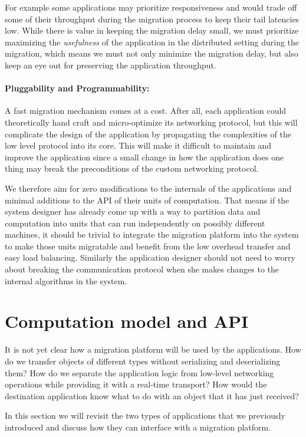 For example some applications may prioritize responsiveness and
    would trade off
    some of their throughput during the migration process to keep their
    tail latencies low. While there is value in keeping the migration delay
    small, we must
    prioritize maximizing the \emph{usefulness} of the application in
    the distributed setting during the migration, which means we must not only
    minimize the migration delay, but also keep an eye out for preserving
    the application throughput.

\paragraph{Pluggability and Programmability:}
A fast migration mechanism comes at a cost. After all, each application
could theoretically hand craft and micro-optimize its networking protocol,
but this will complicate the design of the application by propagating
the complexities of the low level protocol into its core.
This will make it difficult to maintain and improve the
application since a small change in how the application does one thing
may break the preconditions of the custom networking protocol.

We therefore aim for zero modifications to the
internals of the applications and minimal additions to the API of their
units of computation. That means if the system designer has already come up
with a way to partition data and computation into units that can run
independently on possibly different machines, it should be trivial to integrate
the migration platform into the system to make those units migratable and
benefit from the low overhead transfer and easy load balancing.
Similarly the application designer should not need to worry about breaking the communication
protocol when she makes changes to the internal algorithms in the system.

\section{Computation model and API}
\label{sec:api}
It is not yet clear how a migration platform will be used by the
applications. How do we transfer objects of different types without serializing
and deserializing
them? How do we separate the application logic from low-level networking
operations while
providing it with a real-time transport? How would the destination application
know what to do with an object that it has just received?

In this section we will revisit the two types of applications that
we previously introduced and discuss how they can interface with a
migration platform.

